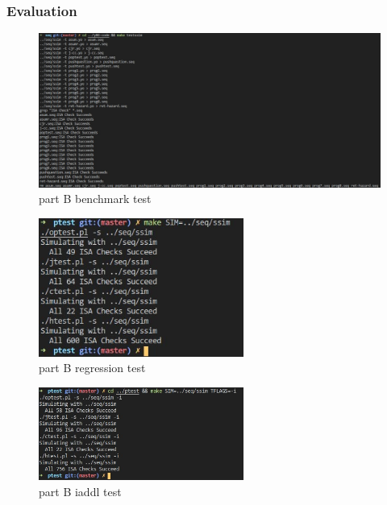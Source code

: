 \documentclass{article}
\begin{document}
\subsubsection{Evaluation}
\begin{figure}[H] %
        \centering %
        \includegraphics[width=1.0\textwidth]{partB-benchmark.jpg} %
        \caption{part B benchmark test} %
        \label{Fig.partB-benchmark} %
\end{figure}
\begin{figure}[H] %
        \centering %
        \includegraphics[width=0.6\textwidth]{partB-regression-test.jpg} %
        \caption{part B regression test} %
        \label{Fig.partB-regression} %
\end{figure}
\begin{figure}[H] %
        \centering %
        \includegraphics[width=0.6\textwidth]{partB-test-iaddl.jpg} %
        \caption{part B iaddl test} %
        \label{Fig.partB-iaddl} %
\end{figure}
\end{document}
